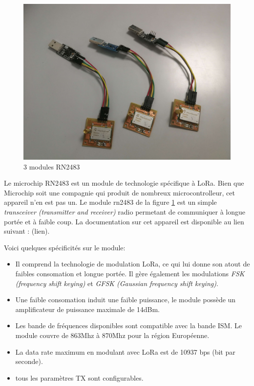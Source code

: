\begin{figure}[h]
\centering

\includegraphics[scale=0.08]{images/rn2483.png}
\caption{3 modules RN2483}\label{term34}
\end{figure}


Le microchip RN2483 est un module de technologie spécifique à LoRa. Bien que Microchip soit une compagnie qui produit de nombreux microcontrolleur, cet appareil n'en est pas un. Le module rn2483 de la figure \ref{term34} est un simple \textit{transceiver (transmitter and receiver)} radio permetant de communiquer à longue portée et à faible coup. La documentation sur cet appareil est disponible au lien suivant : (lien). 

Voici quelques spécificités sur le module:
\begin{itemize}
\item Il comprend la technologie de modulation LoRa, ce qui lui donne son atout de faibles consomation et longue portée. Il gère également les modulations \textit{FSK (frequency shift keying)} et \textit{GFSK (Gaussian frequency shift keying)}.
\item Une faible consomation induit une faible puissance, le module possède un amplificateur de puissance maximale de 14dBm.
\item Les bande de fréquences disponibles sont compatible avec la bande ISM. Le module couvre de 863Mhz à 870Mhz pour la région Européenne.
\item La data rate maximum en modulant avec LoRa est de 10937 bps (bit par seconde).
\item tous les paramètres TX sont configurables.
\end{itemize}

